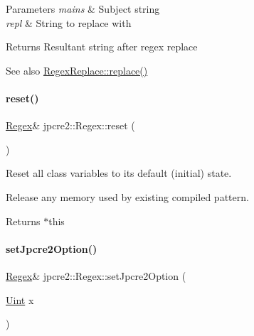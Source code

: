 \begin{DoxyParams}{Parameters}
{\em mains} & Subject string \\
\hline
{\em repl} & String to replace with \\
\hline
\end{DoxyParams}
\begin{DoxyReturn}{Returns}
Resultant string after regex replace 
\end{DoxyReturn}
\begin{DoxySeeAlso}{See also}
\hyperlink{classjpcre2_1_1RegexReplace_afd087fa7a9bfedec802d1a3dd7edbdd0_afd087fa7a9bfedec802d1a3dd7edbdd0}{Regex\+Replace\+::replace()} 
\end{DoxySeeAlso}
\hypertarget{classjpcre2_1_1Regex_a91f6afe257e9633cbb79a98649ab8d02_a91f6afe257e9633cbb79a98649ab8d02}{}\label{classjpcre2_1_1Regex_a91f6afe257e9633cbb79a98649ab8d02_a91f6afe257e9633cbb79a98649ab8d02} 
\paragraph{\texorpdfstring{reset()}{reset()}}
{\footnotesize\ttfamily \hyperlink{classjpcre2_1_1Regex}{Regex}\& jpcre2\+::\+Regex\+::reset (\begin{DoxyParamCaption}{ }\end{DoxyParamCaption})\hspace{0.3cm}{\ttfamily [inline]}}



Reset all class variables to its default (initial) state. 

Release any memory used by existing compiled pattern. \begin{DoxyReturn}{Returns}
$\ast$this 
\end{DoxyReturn}
\hypertarget{classjpcre2_1_1Regex_a031617a19638ef752dcd2b29fa3464d5_a031617a19638ef752dcd2b29fa3464d5}{}\label{classjpcre2_1_1Regex_a031617a19638ef752dcd2b29fa3464d5_a031617a19638ef752dcd2b29fa3464d5} 
\paragraph{\texorpdfstring{set\+Jpcre2\+Option()}{setJpcre2Option()}}
{\footnotesize\ttfamily \hyperlink{classjpcre2_1_1Regex}{Regex}\& jpcre2\+::\+Regex\+::set\+Jpcre2\+Option (\begin{DoxyParamCaption}\item[{\hyperlink{namespacejpcre2_a078242d38221a13fb3543b9edd78c099}{Uint}}]{x }\end{DoxyParamCaption})\hspace{0.3cm}{\ttfamily [inline]}}



